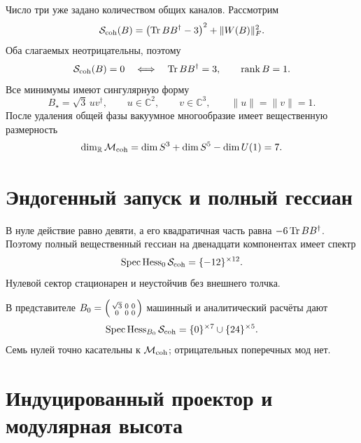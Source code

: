 Число три уже задано количеством общих каналов. Рассмотрим
\begin{equation}
 \mathcal S_{\rm coh}(B)
 =\left(\operatorname{Tr} BB^\dagger-3\right)^2+\|W(B)\|_F^2.
 \label{eq:v7-edge-coherence-action}
\end{equation}
Оба слагаемых неотрицательны, поэтому
\begin{equation}
 \mathcal S_{\rm coh}(B)=0
 \quad\Longleftrightarrow\quad
 \operatorname{Tr} BB^\dagger=3,
 \qquad \operatorname{rank} B=1.
 \label{eq:v7-edge-coherence-zero-set}
\end{equation}
Все минимумы имеют сингулярную форму
\begin{equation}
 B_\star=\sqrt3\,u v^\dagger,
 \qquad u\in\mathbb C^2,\qquad v\in\mathbb C^3,
 \qquad \|u\|=\|v\|=1.
 \label{eq:v7-edge-coherence-vacuum}
\end{equation}
После удаления общей фазы вакуумное многообразие имеет вещественную
размерность
\begin{equation}
 \dim_{\mathbb R}\mathcal M_{\rm coh}
 =\dim S^3+\dim S^5-\dim U(1)=7.
 \label{eq:v7-edge-coherence-vacuum-dimension}
\end{equation}

\section{Эндогенный запуск и полный гессиан}

В нуле действие равно девяти, а его квадратичная часть равна
$-6\operatorname{Tr} BB^\dagger$. Поэтому полный вещественный гессиан на двенадцати
компонентах имеет спектр
\begin{equation}
 \operatorname{Spec}\operatorname{Hess}_0\mathcal S_{\rm coh}
 =\{-12\}^{\times12}.
 \label{eq:v7-edge-coherence-origin-hessian}
\end{equation}
Нулевой сектор стационарен и неустойчив без внешнего толчка.

В представителе
$B_0=\begin{psmallmatrix}\sqrt3&0&0\\0&0&0\end{psmallmatrix}$
машинный и аналитический расчёты дают
\begin{equation}
 \operatorname{Spec}\operatorname{Hess}_{B_0}\mathcal S_{\rm coh}
 =\{0\}^{\times7}\cup\{24\}^{\times5}.
 \label{eq:v7-edge-coherence-vacuum-hessian}
\end{equation}
Семь нулей точно касательны к $\mathcal M_{\rm coh}$; отрицательных
поперечных мод нет.

\section{Индуцированный проектор и модулярная высота}

